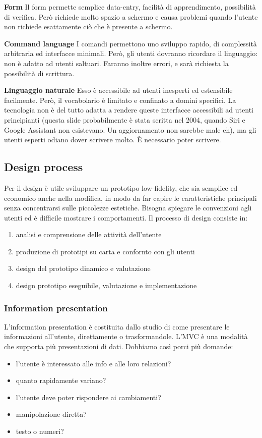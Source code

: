 \documentclass{article}
\begin{document}
\textbf{Form} Il form permette semplice data-entry, facilità di apprendimento, possibilità di verifica. Però richiede
molto spazio a schermo e causa problemi quando l'utente non richiede esattamente ciò che è presente a
schermo.

\textbf{Command language} I comandi permettono uno sviluppo rapido, di complessità arbitraria ed interfacce
minimali. Però, gli utenti dovranno ricordare il linguaggio: non è adatto ad utenti saltuari. Faranno inoltre
errori, e sarà richiesta la possibilità di scrittura.

\textbf{Linguaggio naturale} Esso è accessibile ad utenti inesperti ed estensibile facilmente. Però, il vocabolario
è limitato e confinato a domini specifici. La tecnologia non è del tutto adatta a rendere queste interfacce
accessibili ad utenti principianti (questa slide probabilmente è stata scritta nel 2004, quando Siri e Google
Assistant non esistevano. Un aggiornamento non sarebbe male eh), ma gli utenti esperti odiano dover
scrivere molto. È necessario poter scrivere.



\subsection{Design process}

Per il design è utile sviluppare un prototipo low-fidelity, che sia semplice ed economico anche nella modifica,
in modo da far capire le caratteristiche principali senza concentrarsi sulle piccolezze estetiche. Bisogna
spiegare le convenzioni agli utenti ed è difficile mostrare i comportamenti. Il processo di design consiste in:
\begin{enumerate}
    \item analisi e comprensione delle attività dell'utente
    \item produzione di prototipi su carta e confornto con gli utenti
    \item design del prototipo dinamico e valutazione
    \item design prototipo eseguibile, valutazione e implementazione
\end{enumerate}

\subsubsection{Information presentation}
L'information presentation è costituita dallo studio di come presentare le informazioni all'utente, direttamente o trasformandole. L'MVC è una modalità che supporta più presentazioni di dati. Dobbiamo così
porci più domande:
\begin{itemize}
    \item l'utente è interessato alle info e alle loro relazioni?
    \item quanto rapidamente variano?
    \item l'utente deve poter rispondere ai cambiamenti?
    \item manipolazione diretta?
    \item testo o numeri?
\end{itemize}
\end{document}
